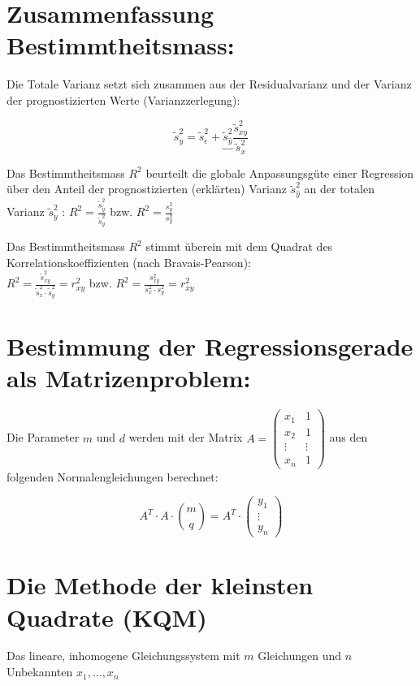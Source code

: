 \documentclass[10pt]{article}
\begin{document}
\section*{Zusammenfassung Bestimmtheitsmass:}
Die Totale Varianz setzt sich zusammen aus der Residualvarianz und der Varianz der prognostizierten Werte (Varianzzerlegung):

$$
\tilde{s}_{y}^{2}=\tilde{s}_{\epsilon}^{2}+\underbrace{\tilde{s}_{\hat{y}}^{2}} \frac{\tilde{s}_{x y}^{2}}{\tilde{s}_{x}^{2}}
$$

Das Bestimmtheitsmass $R^{2}$ beurteilt die globale Anpassungsgüte einer Regression über den Anteil der prognostizierten (erklärten) Varianz $\tilde{s}_{\hat{y}}^{2}$ an der totalen Varianz $\tilde{s}_{y}^{2}$ : $R^{2}=\frac{\tilde{s}_{\tilde{y}}^{2}}{\tilde{s}_{y}^{2}}$ bzw. $R^{2}=\frac{s_{y}^{2}}{s_{y}^{2}}$

Das Bestimmtheitsmass $R^{2}$ stimmt überein mit dem Quadrat des Korrelationskoeffizienten (nach Bravais-Pearson):\\
$R^{2}=\frac{\tilde{s}_{x y}^{2}}{\tilde{s}_{x}^{2} \cdot \tilde{s}_{y}^{2}}=r_{x y}^{2}$ bzw. $R^{2}=\frac{s_{x y}^{2}}{s_{x}^{2} \cdot s_{y}^{2}}=r_{x y}^{2}$

\section*{Bestimmung der Regressionsgerade als Matrizenproblem:}
Die Parameter $m$ und $d$ werden mit der Matrix $A=\left(\begin{array}{cc}x_{1} & 1 \\ x_{2} & 1 \\ \vdots & \vdots \\ x_{n} & 1\end{array}\right)$ aus den folgenden Normalengleichungen berechnet:

$$
A^{T} \cdot A \cdot\binom{m}{q}=A^{T} \cdot\left(\begin{array}{c}
y_{1} \\
\vdots \\
y_{n}
\end{array}\right)
$$

\section*{Die Methode der kleinsten Quadrate (KQM)}
Das lineare, inhomogene Gleichungssystem mit $m$ Gleichungen und $n$ Unbekannten $x_{1}, \ldots, x_{n}$
\end{document}
